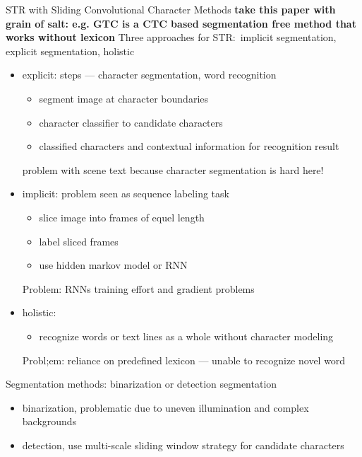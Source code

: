 STR with Sliding Convolutional Character Methods\cite{yin_scene_2017}
\textbf{take this paper with grain of salt: e.g. GTC is a CTC based segmentation free method that
works without lexicon}
Three approaches for STR:\ implicit segmentation, explicit segmentation, holistic
\begin{itemize}
    \item explicit: steps --- character segmentation, word recognition
        \begin{itemize}
            \item segment image at character boundaries
            \item character classifier to candidate characters
            \item classified characters and contextual information for recognition result
        \end{itemize}
        problem with scene text because character segmentation is hard here!
    \item implicit: problem seen as sequence labeling task
        \begin{itemize}
            \item slice image into frames of equel length
            \item label sliced frames
            \item use hidden markov model or RNN
        \end{itemize}
        Problem: RNNs training effort and gradient problems
    \item holistic:
        \begin{itemize}
            \item recognize words or text lines as a whole without character modeling
        \end{itemize}
        Probl;em: reliance on predefined lexicon --- unable to recognize novel word
\end{itemize}
Segmentation methods: binarization or detection segmentation
\begin{itemize}
    \item binarization, problematic due to uneven illumination and complex backgrounds
    \item detection, use multi-scale sliding window strategy for candidate characters
\end{itemize}


